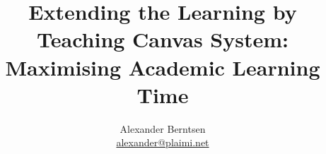 \documentclass{article}
\title{\vspace{-15mm}\fontsize{16pt}{10pt}\selectfont
\textbf{Extending the Learning by Teaching Canvas System: Maximising Academic 
Learning Time}}
\author{\begin{tabular}{c c c}
    Alexander Berntsen \\
    \href{mailto:alexander@plaimi.net}{alexander@plaimi.net}
\end{tabular}
}
\begin{document}
\maketitle
\begin{abstract}
\noindent 
\end{abstract}
\tableofcontents
\listoffigures
\newpage
\begin{multicols}{2}
    
\end{multicols}


\newpage
\end{document}
